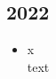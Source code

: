 \subsection{2022}
\begin{history}


    \begin{itemize}

        \item x\\
              text

    \end{itemize}

\end{history}
